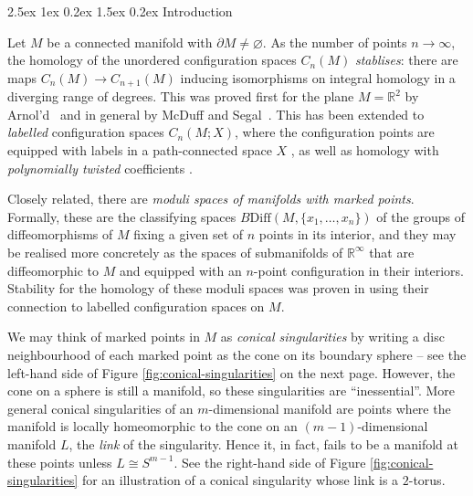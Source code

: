 \documentclass[reqno,a4paper]{article}
\makeatletter
\numberwithin{equation}{section}
\theoremstyle{italicised}
\theoremstyle{upright}
\theoremstyle{italicised-restate}
\renewcommand*{\section}{\@startsection{section}{1}{\z@}%
	{2.5ex \@plus 1ex \@minus 0.2ex}%
	{1.5ex \@plus 0.2ex}%
	{\normalfont\large\bfseries}}
\newcommand{\bR}{\mathbb{R}}
\makeatother
\begin{document}


\section{Introduction}


Let $M$ be a connected manifold with $\partial M \neq \varnothing$. As the number of points $n\to\infty$, the homology of the unordered configuration spaces $C_n(M)$ \emph{stablises}: there are maps $C_n(M) \to C_{n+1}(M)$ inducing isomorphisms on integral homology in a diverging range of degrees. This was proved first for the plane $M = \bR^2$ by Arnol'd~\cite{Arnold1970Certaintopologicalinvariants} and in general by McDuff and Segal~\cite{Segal1973Configurationspacesand,McDuff1975Configurationspacesof,Segal1979topologyofspaces}. This has been extended to \emph{labelled} configuration spaces $C_n(M;X)$, where the configuration points are equipped with labels in a path-connected space $X$ \cite{Randal-Williams2013Homologicalstabilityunordered}, as well as homology with \emph{polynomially twisted} coefficients \cite{Palmer2018Twistedhomologicalstability}.

Closely related, there are \emph{moduli spaces of manifolds with marked points}. Formally, these are the classifying spaces $B\mathrm{Diff}(M,\{x_1,\ldots,x_n\})$ of the groups of diffeomorphisms of $M$ fixing a given set of $n$ points in its interior, and they may be realised more concretely as the spaces of submanifolds of $\bR^\infty$ that are diffeomorphic to $M$ and equipped with an $n$-point configuration in their interiors. Stability for the homology of these moduli spaces was proven in \cite{Tillmann2016Homologystabilitysymmetric} using their connection to labelled configuration spaces on $M$.

We may think of marked points in $M$ as \emph{conical singularities} by writing a disc neighbourhood of each marked point as the cone on its boundary sphere -- see the left-hand side of Figure \ref{fig:conical-singularities} on the next page. However, the cone on a sphere is still a manifold, so these singularities are ``inessential''. More general conical singularities of an $m$-dimensional manifold are points where the manifold is locally homeomorphic to the cone on an $(m-1)$-dimensional manifold $L$, the \emph{link} of the singularity. Hence it, in fact, fails to be a manifold at these points unless $L \cong S^{m-1}$. See the right-hand side of Figure \ref{fig:conical-singularities} for an illustration of a conical singularity whose link is a $2$-torus.
\end{document}
